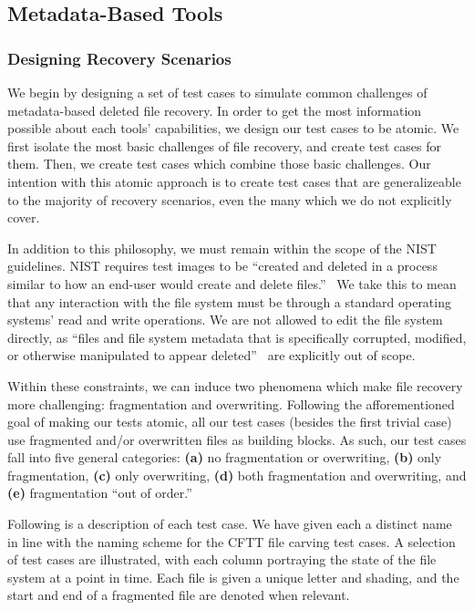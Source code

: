 \subsection{Metadata-Based Tools}
\subsubsection{Designing Recovery Scenarios}

We begin by designing a set of test cases to simulate common challenges of metadata-based deleted file recovery.
In order to get the most information possible about each tools' capabilities, we design our test cases to be atomic.
We first isolate the most basic challenges of file recovery, and create test cases for them.
Then, we create test cases which combine those basic challenges.
Our intention with this atomic approach is to create test cases that are generalizeable to the majority of recovery scenarios, even the many which we do not explicitly cover.

In addition to this philosophy, we must remain within the scope of the NIST guidelines.
NIST requires test images to be ``created and deleted in a process similar to how an end-user would create and delete files.''~\cite{meta:dfr:standards}
We take this to mean that any interaction with the file system must be through a standard operating systems'  read and write operations.
We are not allowed to edit the file system directly, as ``files and file system metadata that is specifically corrupted, modified, or otherwise manipulated to appear deleted''~\cite{meta:dfr:standards} are explicitly out of scope.

Within these constraints, we can induce two phenomena which make file recovery more challenging: fragmentation and overwriting.
Following the afforementioned goal of making our tests atomic, all our test cases (besides the first trivial case) use fragmented and/or overwritten files as building blocks.
As such, our test cases fall into five general categories:
{\bf(a)} no fragmentation or overwriting, 
{\bf (b)} only fragmentation,
{\bf (c)} only overwriting,
{\bf (d)} both fragmentation and overwriting,
and {\bf (e)} fragmentation ``out of order.''


Following is a description of each test case.
We have given each a distinct name in line with the naming scheme for the CFTT file carving test cases.
A selection of test cases are illustrated, with each column portraying the state of the file system at a point in time. 
Each file is given a unique letter and shading, and the start and end of a fragmented file are denoted when relevant.

